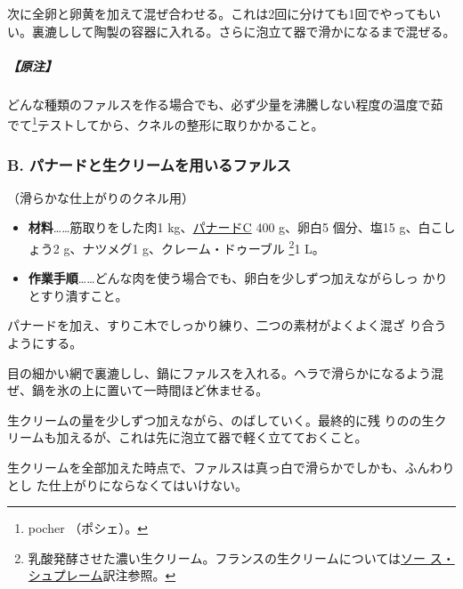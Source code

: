 \begin{recette}
次に全卵と卵黄を加えて混ぜ合わせる。これは2回に分けても1回でやってもい
い。裏漉しして陶製の容器に入れる。さらに泡立て器で滑かになるまで混ぜる。

\hypertarget{nota-farce-a}{%
\subparagraph{【原注】}\label{nota-farce-a}}

どんな種類のファルスを作る場合でも、必ず少量を沸騰しない程度の温度で茹
でて\footnote{pocher （ポシェ）。}テストしてから、クネルの整形に取りかかること。

\maeaki

\hypertarget{farce-b}{%
\subsubsection{B. パナードと生クリームを用いるファルス}\label{farce-b}}



（滑らかな仕上がりのクネル用）

\begin{itemize}
\item
  \textbf{材料}\ldots{}\ldots{}筋取りをした肉1
  kg、\protect\hyperlink{panade-c}{パナードC} 400 g、卵白5 個分、塩15
  g、白こしょう2 g、ナツメグ1 g、クレーム・ドゥーブル \footnote{乳酸発酵させた濃い生クリーム。フランスの生クリームについては\protect\hyperlink{sauce-supreme}{ソー
    ス・シュプレーム}訳注参照。}1\undemi{} L。
\item
  \textbf{作業手順}\ldots{}\ldots{}どんな肉を使う場合でも、卵白を少しずつ加えながらしっ
  かりとすり潰すこと。
\end{itemize}

パナードを加え、すりこ木でしっかり練り、二つの素材がよくよく混ざ
り合うようにする。

目の細かい網で裏漉しし、鍋にファルスを入れる。ヘラで滑らかになるよう混
ぜ、鍋を氷の上に置いて一時間ほど休ませる。

生クリームの\untiers{}量を少しずつ加えながら、のばしていく。最終的に残
りの\deuxtiers{}の生クリームも加えるが、これは先に泡立て器で軽く立てておくこと。

生クリームを全部加えた時点で、ファルスは真っ白で滑らかでしかも、ふんわりとし
た仕上がりにならなくてはいけない。


\end{recette}
